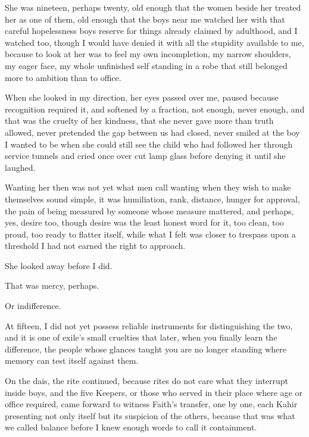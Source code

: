 She was nineteen, perhaps twenty, old enough that the women beside her treated her as one of them, old enough
 that the boys near me watched her with that careful hopelessness boys reserve for things already claimed by 
 adulthood, and I watched too, though I would have denied it with all the stupidity available to me, because 
 to look at her was to feel my own incompletion, my narrow shoulders, my eager face, my whole unfinished self 
 standing in a robe that still belonged more to ambition than to office.\par

When she looked in my direction, her eyes passed over me, paused because recognition required it, and softened 
by a fraction, not enough, never enough, and that was the cruelty of her kindness, that she never gave more 
than truth allowed, never pretended the gap between us had closed, never smiled at the boy I wanted to be 
when she could still see the child who had followed her through service tunnels and cried once over cut lamp 
glass before denying it until she laughed.\par

Wanting her then was not yet what men call wanting when they wish to make themselves sound simple, it was 
humiliation, rank, distance, hunger for approval, the pain of being measured by someone whose measure mattered,
 and perhaps, yes, desire too, though desire was the least honest word for it, too clean, too proud, 
 too ready to flatter itself, while what I felt was closer to trespass upon a threshold I had not earned 
 the right to approach.\par

She looked away before I did.\par
That was mercy, perhaps.\par
Or indifference.\par

At fifteen, I did not yet possess reliable instruments for distinguishing the two, and it is one of exile’s 
small cruelties that later, when you finally learn the difference, the people whose glances taught you are 
no longer standing where memory can test itself against them.\par


On the dais, the rite continued, because rites do not care what they interrupt inside boys, and the five 
Keepers, or those who served in their place where age or office required, came forward to witness Faith’s 
transfer, one by one, each Kahir presenting not only itself but its suspicion of the others, because that 
was what we called balance before I knew enough words to call it containment.\par

